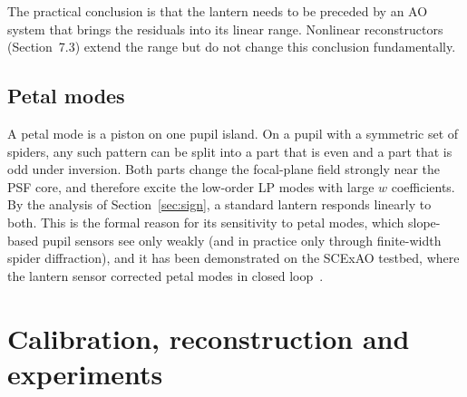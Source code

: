 \documentclass[11pt,a4paper]{article}
\begin{document}
The practical conclusion is that the lantern needs to be preceded by an AO system that brings the residuals into its linear range. Nonlinear reconstructors (Section~7.3) extend the range but do not change this conclusion fundamentally.

\subsection{Petal modes}
A petal mode is a piston on one pupil island. On a pupil with a symmetric set of spiders, any such pattern can be split into a part that is even and a part that is odd under inversion. Both parts change the focal-plane field strongly near the PSF core, and therefore excite the low-order LP modes with large $w$ coefficients. By the analysis of Section~\ref{sec:sign}, a standard lantern responds linearly to both. This is the formal reason for its sensitivity to petal modes, which slope-based pupil sensors see only weakly (and in practice only through finite-width spider diffraction), and it has been demonstrated on the SCExAO testbed, where the lantern sensor corrected petal modes in closed loop~\cite{Lin2023PRL}.

\section{Calibration, reconstruction and experiments}
\end{document}
